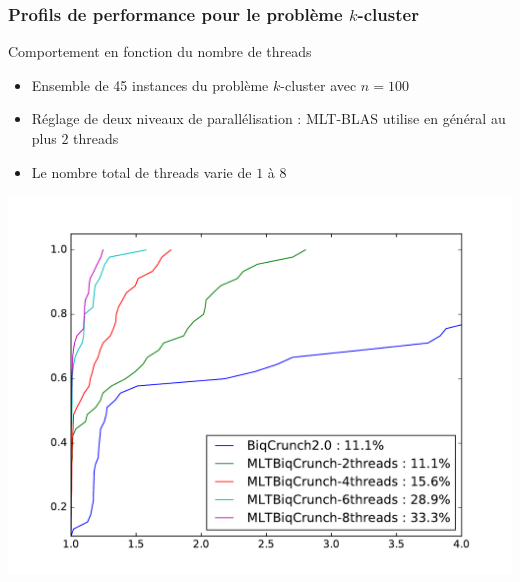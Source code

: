 \documentclass{beamer}
\begin{document}
\begin{frame}
\frametitle{Profils de performance pour le problème $k$-cluster}

\begin{block}{Comportement en fonction du nombre de threads}
\begin{itemize}
\item Ensemble de 45 instances du problème $k$-cluster 	avec $n=100$
\item Réglage de deux niveaux de parallélisation : MLT-BLAS utilise en général au plus $2$ threads
\item Le nombre total de threads varie de $1$ à $8$
\end{itemize}
\end{block}

\includegraphics[scale=0.33]{fig/MLTBiqCrunch0.pdf}

\end{frame}

\end{document}
